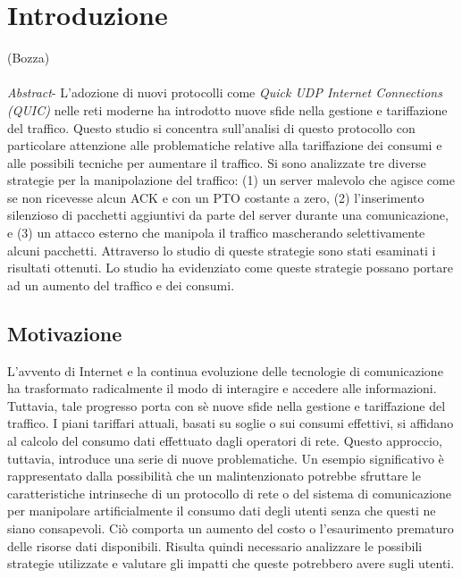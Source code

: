 \chapter{Introduzione}
\label{cap:introduzione}

(Bozza)\\\\
\emph{Abstract}- L'adozione di nuovi protocolli come \emph{Quick UDP Internet Connections (QUIC) } nelle reti moderne ha introdotto nuove sfide nella gestione e tariffazione del traffico.
Questo studio si concentra sull'analisi di questo protocollo con particolare attenzione alle problematiche relative alla tariffazione dei consumi e alle possibili tecniche per aumentare il traffico.
Si sono analizzate tre diverse strategie per la manipolazione del traffico: (1) un server malevolo che agisce come se non ricevesse alcun ACK e con un PTO costante a zero, (2) l'inserimento silenzioso di 
pacchetti aggiuntivi da parte del server durante una comunicazione, e (3) un attacco esterno che manipola il traffico mascherando selettivamente alcuni pacchetti.
Attraverso lo studio di queste strategie sono stati esaminati i risultati ottenuti. Lo studio ha evidenziato come queste strategie possano portare ad un aumento del traffico e 
dei consumi.


\section{Motivazione}
L'avvento di Internet e la continua evoluzione delle tecnologie di comunicazione ha trasformato radicalmente il modo di interagire e accedere alle informazioni.
Tuttavia, tale progresso porta con sè nuove sfide nella gestione e tariffazione del traffico.
I piani tariffari attuali, basati su soglie o sui consumi effettivi, si affidano al calcolo del consumo dati effettuato dagli operatori di rete.
Questo approccio, tuttavia, introduce una serie di nuove problematiche. Un esempio significativo è rappresentato 
dalla possibilità che un malintenzionato potrebbe sfruttare le caratteristiche intrinseche di un protocollo di rete o del sistema di comunicazione 
per manipolare artificialmente il consumo dati degli utenti senza che questi ne siano consapevoli.
Ciò comporta un aumento del costo o l'esaurimento prematuro delle risorse dati disponibili.
Risulta quindi necessario analizzare le possibili strategie utilizzate e valutare gli impatti che queste potrebbero avere sugli utenti.

